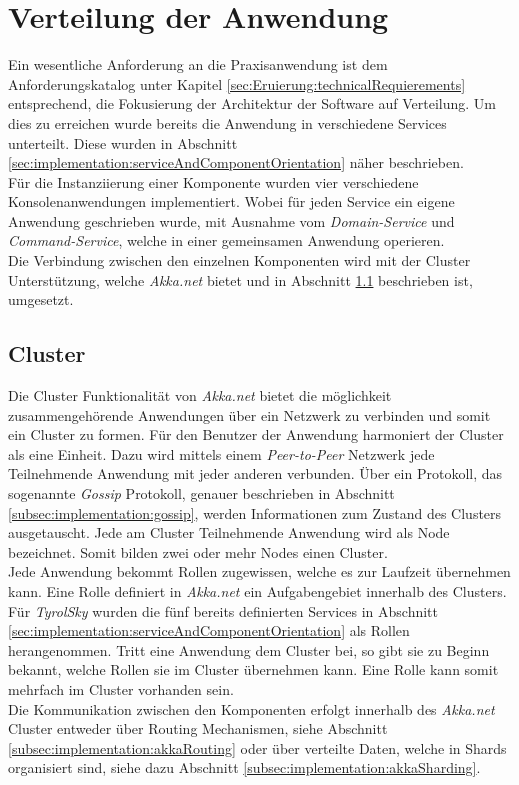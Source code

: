 \section{Verteilung der Anwendung}
\label{subsec:implementation:ApplicationDistribution}
Ein wesentliche Anforderung an die Praxisanwendung ist dem Anforderungskatalog unter Kapitel \ref{sec:Eruierung:technicalRequierements} entsprechend, die Fokusierung der Architektur der Software auf Verteilung. Um dies zu erreichen wurde bereits die Anwendung in verschiedene Services unterteilt. Diese wurden in Abschnitt \ref{sec:implementation:serviceAndComponentOrientation} näher beschrieben. \\
Für die Instanziierung einer Komponente wurden vier verschiedene Konsolenanwendungen implementiert. Wobei für jeden Service ein eigene Anwendung geschrieben wurde, mit Ausnahme vom \textit{Domain-Service} und \textit{Command-Service}, welche in einer gemeinsamen Anwendung operieren. \\
Die Verbindung zwischen den einzelnen Komponenten wird mit der Cluster Unterstützung, welche \textit{Akka.net} bietet und in Abschnitt \ref{subsec:implementation:akka:cluster} beschrieben ist, umgesetzt. 

\subsection{Cluster}
\label{subsec:implementation:akka:cluster}
Die Cluster Funktionalität von \textit{Akka.net} bietet die möglichkeit zusammengehörende Anwendungen über ein Netzwerk zu verbinden und somit ein Cluster zu formen. Für den Benutzer der Anwendung harmoniert der Cluster als eine Einheit. Dazu wird mittels einem \textit{Peer-to-Peer} Netzwerk jede Teilnehmende Anwendung mit jeder anderen verbunden. Über ein Protokoll, das sogenannte \textit{Gossip} Protokoll, genauer beschrieben in Abschnitt \ref{subsec:implementation:gossip}, werden Informationen zum Zustand des Clusters ausgetauscht. Jede am Cluster Teilnehmende Anwendung wird als Node bezeichnet. Somit bilden zwei oder mehr Nodes einen Cluster. \\
Jede Anwendung bekommt Rollen zugewissen, welche es zur Laufzeit übernehmen kann. Eine Rolle definiert in \textit{Akka.net} ein Aufgabengebiet innerhalb des Clusters. Für \textit{TyrolSky} wurden die fünf bereits definierten Services in Abschnitt \ref{sec:implementation:serviceAndComponentOrientation} als Rollen herangenommen. Tritt eine Anwendung dem Cluster bei, so gibt sie zu Beginn bekannt, welche Rollen sie im Cluster übernehmen kann. Eine Rolle kann somit mehrfach im Cluster vorhanden sein. \\
Die Kommunikation zwischen den Komponenten erfolgt innerhalb des \textit{Akka.net} Cluster entweder über Routing Mechanismen, siehe Abschnitt \ref{subsec:implementation:akkaRouting} oder über verteilte Daten, welche in Shards organisiert sind, siehe dazu Abschnitt \ref{subsec:implementation:akkaSharding}. 

